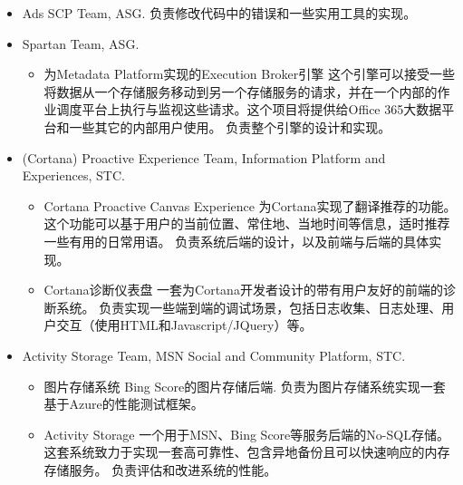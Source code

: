 \documentclass[10pt,a4paper,roman]{moderncv} %
\begin{document}
        {\begin{itemize}%
         \item Ads SCP Team, ASG.
               负责修改代码中的错误和一些实用工具的实现。
         \item Spartan Team, ASG.
               \begin{itemize}%
               \item 为Metadata Platform实现的Execution Broker引擎\newline{}%
                     这个引擎可以接受一些将数据从一个存储服务移动到另一个存储服务的请求，并在一个内部的作业调度平台上执行与监视这些请求。这个项目将提供给Office 365大数据平台和一些其它的内部用户使用。\newline{}%
                     负责整个引擎的设计和实现。
               \end{itemize}
         \item (Cortana) Proactive Experience Team, Information Platform and Experiences, STC.
               \begin{itemize}%
               \item Cortana Proactive Canvas Experience\newline{}%
                     为Cortana实现了翻译推荐的功能。这个功能可以基于用户的当前位置、常住地、当地时间等信息，适时推荐一些有用的日常用语。\newline{}%
                     负责系统后端的设计，以及前端与后端的具体实现。
               \item Cortana诊断仪表盘\newline{}%
                     一套为Cortana开发者设计的带有用户友好的前端的诊断系统。\newline{}%
                     负责实现一些端到端的调试场景，包括日志收集、日志处理、用户交互（使用HTML和Javascript/JQuery）等。
               \end{itemize}
         \item Activity Storage Team, MSN Social and Community Platform, STC.
               \begin{itemize}%
               \item 图片存储系统\newline{}%
                     Bing Score的图片存储后端.\newline{}%
                     负责为图片存储系统实现一套基于Azure的性能测试框架。
               \item Activity Storage\newline{}%
                     一个用于MSN、Bing Score等服务后端的No-SQL存储。这套系统致力于实现一套高可靠性、包含异地备份且可以快速响应的内存存储服务。\newline{}%
                     负责评估和改进系统的性能。
               \end{itemize}
         \end{itemize}}
\end{document}
